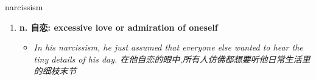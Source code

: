 
\begin{frame}
{\huge narcissism}
\begin{center}
\begin{enumerate}\Large
  \item \textbf{n. 自恋: excessive love or admiration of oneself}
  \begin{itemize}
    \item \em{\Large{In his narcissism, he just assumed that everyone else wanted to hear the tiny details of his day. 在他自恋的眼中,所有人仿佛都想要听他日常生活里的细枝末节}}
  \end{itemize}
\end{enumerate}
\end{center}
\end{frame}
